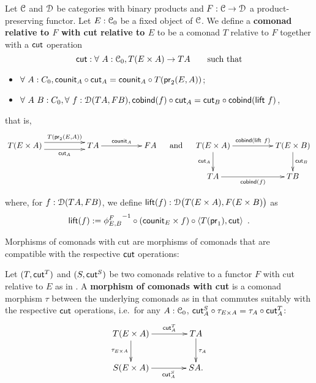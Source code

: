 \documentclass[a4paper,USenglish]{lipics}
\newcommand{\fat}[1]{\textbf{#1}}
\begin{document}
\begin{defn}%
\label{def:rel_comonad_with_cut}
 Let $\C$ and $\D$ be categories with binary products and $F:\C\to\D$ a product-preserving functor. Let $E:\C_0$ be a fixed object of $\C$.
 We define a \fat{comonad relative to $F$ with cut relative to $E$} to be a comonad $T$ relative to $F$ together with a $\cut$ operation 
    \[ \cut : \forall~A:\C_0, T(E\times A) \to TA \qquad \text{such that}\]
  \begin{itemize}
   \item $\forall~A:C_0, \comp{\cut_A}{\counit_A} = \comp{T(\pr_2(E,A))}{\counit_{A}}$;
   \item $\forall~A~B:C_0,\forall~f:\D(TA,FB), \comp{\cut_A}{\cobind(f)} = \comp{\cobind(\extend~f)}{\cut_B}$,
  \end{itemize}
that is,
\[
 \begin{xy}
  \xymatrix@C=5em{
                T(E\times A) \ar@<1ex>[r]^-{T(\pr_2(E,A))} \ar@<-1ex>[r]_-{\cut_A} & TA \ar[r]^{\counit_A} & FA
  }
 \end{xy}
 \quad\text{ and } \quad
 \begin{xy}
  \xymatrix@C=5em{
	      T(E\times A) \ar[r]^{\cobind(\extend~f)} \ar[d]_{\cut_A} & T(E\times B) \ar[d]^{\cut_B} \\
	      TA \ar[r]_{\cobind(f)} &  TB 
  }
 \end{xy}
\]


  \noindent
  where, for $f:\D(TA,FB)$, we define $\extend(f) : \D\bigl(T(E\times A),F(E\times B)\bigr)$ as
       \[ \extend(f) := \comp{\comp{\langle T(\pr_1) , \cut \rangle}{(\counit_E\times f)}}{{\phi^{F}_{E,B}}^{-1}} \enspace . \]
  
\end{defn}

Morphisms of comonads with cut are morphisms of comonads that are compatible with the respective $\cut$ operations:

\begin{defn}%
\label{def:morphism_comonad_cut}
 Let $(T,\cut^T)$ and $(S,\cut^S)$ be two comonads relative to a functor $F$ with cut relative to $E$ as in .
 A \fat{morphism of comonads with cut} is a comonad morphism $\tau$ between the underlying comonads as in  that 
 commutes suitably with the respective $\cut$ operations, i.e.\ for any $A : \C_0$,
  $\comp{\tau_{E \times A}}{\cut^S_A}  = \comp{\cut^T_A}{\tau_A}$:
\[
 \begin{xy}
  \xymatrix@C=4em{
                 T(E\times A)   \ar[r]^-{\cut^T_A} \ar[d]_{\tau_{E \times A}}  & TA \ar[d]^{\tau_{A}}\\
                 S(E \times A)  \ar[r]_-{\cut^S_A}   & S A.
  }
 \end{xy}
\]

\end{defn}
\end{document}
